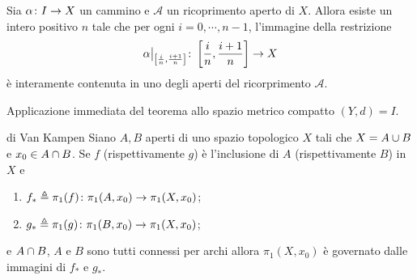 \documentclass[a4paper]{article}
\begin{document}
\begin{snippetcorollary}{}
    Sia \(\alpha\colon I \to X\)
    un cammino e \(\mathcal A\)
    un ricoprimento aperto di \(X\).
    Allora esiste un intero positivo
    \(n\) tale che per ogni \(i=0,\cdots,n-1\),
    l'immagine della restrizione
    \[
        \restr{\alpha}{
            \left[\frac{i}{n}, \frac{i+1}{n}\right]
        }
        \colon
        \left[
            \frac{i}{n},
            \frac{i+1}{n}
        \right] \fromto X
    \]
    è interamente contenuta in uno degli aperti del
    ricorprimento \(\mathcal A\).
\end{snippetcorollary}

\begin{snippetproof}{}
    Applicazione immediata del teorema allo spazio metrico
    compatto \((Y, d) = I\).
\end{snippetproof}

\begin{snippettheorem}{di Van Kampen}
    Siano \(A,B\) aperti di uno spazio topologico
    \(X\) tali che \(X = A \cup B\) e
    \(x_0 \in A \cap B\).
    Se \(f\) (rispettivamente \(g\)) è l'inclusione
    di \(A\) (rispettivamente \(B\)) in \(X\) e
    \begin{enumerate}
        \item \(f_\ast \triangleq \pi_1(f) \colon \pi_1(A, x_0) \to \pi_1(X, x_0)\);
        \item \(g_\ast \triangleq \pi_1(g) \colon \pi_1(B, x_0) \to \pi_1(X, x_0)\);
    \end{enumerate}
    e \(A \cap B\),
    \(A\) e \(B\) sono tutti connessi per archi
    allora \(\pi_1(X, x_0)\)
    è governato dalle immagini di
    \(f_\ast\) e \(g_\ast\).
\end{snippettheorem}
\end{document}
